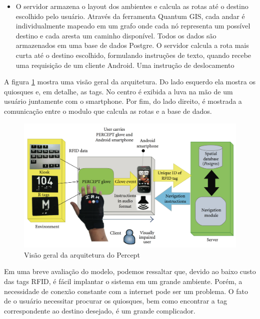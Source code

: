 \documentclass[english,brazilian]{UNISINOSmonografia}
\begin{document}
\begin{itemize}
	\item O servidor armazena o layout dos ambientes e calcula as rotas até o destino escolhido pelo usuário. Através da ferramenta Quantum GIS, cada andar é individualmente mapeado em um grafo onde cada nó representa um possível destino e cada aresta um caminho disponível. Todos os dados são armazenados em uma base de dados Postgre. O servidor calcula a rota mais curta até o destino escolhido, formulando instruções de texto, quando recebe uma requisição de um cliente Android. Uma instrução de deslocamento 
\end{itemize}

A figura \ref{fig:visaoGeralPercept} mostra uma visão geral da arquitetura. Do lado esquerdo ela mostra os quiosques e, em detalhe, as tags. No centro é exibida a luva na mão de um usuário juntamente com o smartphone. Por fim, do lado direito, é mostrada a comunicação entre o modulo que calcula as rotas e a base de dados.

\FloatBarrier
	\begin{figure}
		\caption{Visão geral da arquitetura do Percept}
		\label{fig:visaoGeralPercept}
		\centering%
		\begin{minipage}{.9\textwidth}
			\includegraphics[width=\textwidth]{imgs/perceptArquitetura}
		\end{minipage}
	\end{figure}
\FloatBarrier

Em uma breve avaliação do modelo, podemos ressaltar que, devido ao baixo custo das tags RFID, é fácil implantar o sistema em um grande ambiente. Porém, a necessidade de conexão constante com a internet pode ser um problema. O fato de o usuário necessitar procurar os quiosques, bem como encontrar a tag correspondente ao destino desejado, é um grande complicador.
\end{document}
